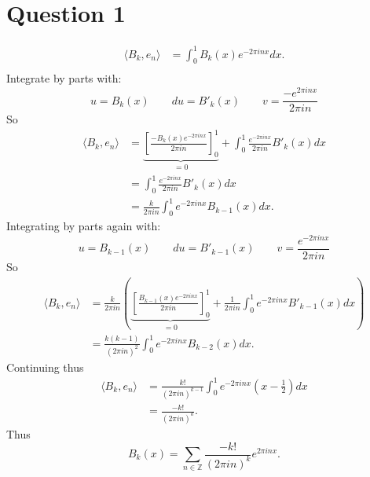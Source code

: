 \documentclass{unswmaths}
\begin{document}
\setlength\parindent{0pt}

\fancyfoot[r]{\today}


\section*{Question 1}
\begin{align*}
	\langle B_k, e_n \rangle &= \int_0^1 B_k(x) e^{-2\pi inx} dx. \\
\end{align*}
Integrate by parts with:
\begin{equation*}
	u = B_k(x) \qquad
	du = {B'}_k(x) \qquad
	v = \frac{-e^{2\pi inx}}{2\pi i n}
\end{equation*}
So
\begin{align*}
	\langle B_k, e_n \rangle &= \underbrace{\left[ 
		\frac{-B_k(x)e^{-2\pi inx}}{2\pi in} \right]^1_0}_{=0}
		+ \int_0^1 \frac{e^{-2\pi inx}}{2\pi in}{B'}_k(x) dx \\
	&= \int_0^1 \frac{e^{-2\pi inx}}{2\pi in}{B'}_k(x) dx \\
	&= \frac{k}{2\pi i n}\int_0^1 e^{-2\pi inx}B_{k-1}(x) dx.
\end{align*}
Integrating by parts again with:
\begin{equation*}
    u = B_{k-1}(x) \qquad
    du = {B'}_{k-1}(x) \qquad
    v = \frac{e^{-2\pi inx}}{2\pi in}
\end{equation*}
So
\begin{align*}
    \langle B_k, e_n \rangle &=
        \frac{k}{2 \pi in}\left( \underbrace{
            \left[\frac{B_{k-1}(x)e^{-2\pi inx}}{2\pi in} \right]_0^1}_{=0}
        + \frac{1}{2\pi in}\int_0^1 e^{-2\pi inx}{B}'_{k-1}(x) dx \right) \\
        &= \frac{k(k-1)}{(2\pi in)^2} \int_0^1 e^{-2\pi inx} B_{k-2}(x) dx.
\end{align*}
Continuing thus
\begin{align*}
    \langle B_k, e_n \rangle 
        &= \frac{k!}{(2\pi in)^{k-1}} \int_0^1 e^{-2\pi inx} (x-\frac{1}{2}) dx \\
        &= \frac{-k!}{(2\pi in)^k}.
\end{align*}
Thus
\begin{equation*}
    B_k(x) = \sum_{n \in \mathbb{Z}} \frac{-k!}{(2\pi in)^k} e^{2\pi inx}.
\end{equation*}
\clearpage 
\end{document}

